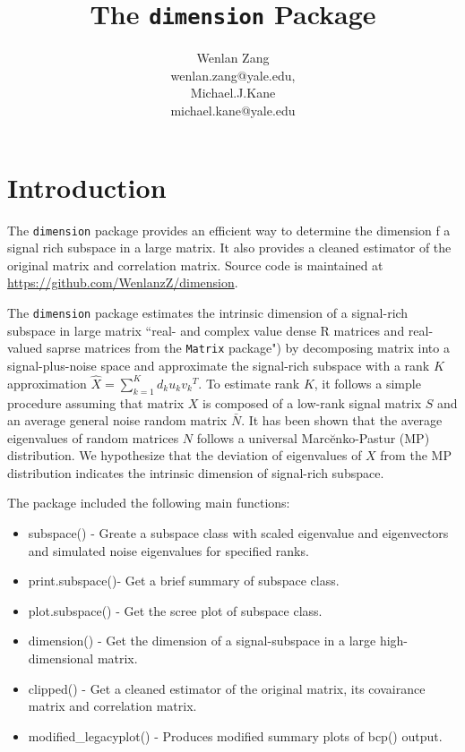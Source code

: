\documentclass[12pt]{article}
\title{The {\tt dimension} Package}
\author{Wenlan Zang \\
wenlan.zang@yale.edu,
\\[6pt]
Michael.J.Kane\\
michael.kane@yale.edu
}
\begin{document}


\maketitle

\thispagestyle{empty}

\section{Introduction}

The {\tt dimension} package provides an efficient way to determine the dimension f a signal rich subspace in a large matrix. It also provides a cleaned estimator of the original matrix and correlation matrix. Source code is maintained at \href{https://github.com/WenlanzZ/dimension}{https://github.com/WenlanzZ/dimension}.

The {\tt dimension} package estimates the intrinsic dimension of a signal-rich subspace in large matrix ``real- and complex value dense R matrices and real-valued saprse matrices from the {\tt Matrix} package") by decomposing matrix into a signal-plus-noise space and approximate the signal-rich subspace with a rank $K$ approximation $\hat{X}=\sum_{k=1}^{K}d_ku_k{v_k}^T$. To estimate rank $K$, it follows a simple procedure assuming that matrix $X$ is composed of a low-rank signal matrix $S$ and an average general noise random matrix $\bar{N}$. It has been shown that the average eigenvalues of random matrices $N$ follows a universal Marc\u{e}nko-Pastur (MP) distribution. We hypothesize that the deviation of eigenvalues of $X$ from the MP distribution indicates the intrinsic dimension of signal-rich subspace.

The package included the following main functions:
\begin{itemize}
\item{subspace() - Greate a subspace class with scaled eigenvalue and eigenvectors and simulated noise eigenvalues for specified ranks.}
\item{print.subspace()- Get a brief summary of subspace class.}
\item{plot.subspace() - Get the scree plot of subspace class.}
\item{dimension() - Get the dimension of a signal-subspace in a large high-dimensional matrix.}
\item{clipped() - Get a cleaned estimator of the original matrix, its covairance matrix and correlation matrix.}
\item{modified\_legacyplot() - Produces modified summary plots of bcp() output.}
\end{itemize}
\end{document}
